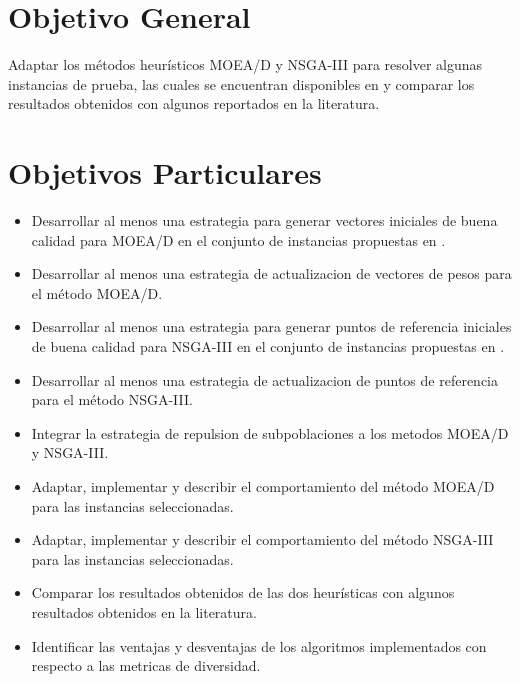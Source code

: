 \documentclass[letterpaper,10pt]{article}
\begin{document}
\section{Objetivo General}

Adaptar los métodos heurísticos MOEA/D y NSGA-III para resolver algunas instancias de prueba, las cuales se encuentran disponibles en \cite{zhang2008multiobjective} y comparar los resultados obtenidos con algunos reportados en la literatura.

\section{Objetivos Particulares}

\begin{itemize}
\item Desarrollar al menos una estrategia para generar vectores iniciales de buena calidad para MOEA/D en el conjunto de instancias propuestas en \cite{zhang2008multiobjective}.

\item Desarrollar al menos una estrategia de actualizacion de vectores de pesos para el método MOEA/D.

\item Desarrollar al menos una estrategia para generar puntos de referencia iniciales de buena calidad para NSGA-III en el conjunto de instancias propuestas en \cite{zhang2008multiobjective}.

\item Desarrollar al menos una estrategia de actualizacion de puntos de referencia para el método NSGA-III.

\item Integrar la estrategia de repulsion de subpoblaciones\cite{ahrari2016multimodal} a los metodos MOEA/D y NSGA-III.

\item Adaptar, implementar y describir el comportamiento del método MOEA/D para las instancias seleccionadas.
 
\item Adaptar, implementar y describir el comportamiento del método NSGA-III para las instancias seleccionadas.

\item Comparar los resultados obtenidos de las dos heurísticas con algunos resultados obtenidos en la literatura.

\item Identificar las ventajas y desventajas de los algoritmos implementados con respecto a las metricas de diversidad.
\end{itemize}
\end{document}
